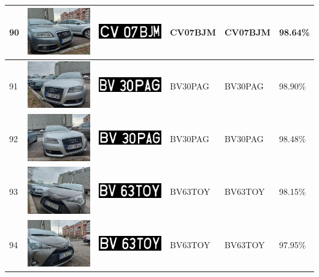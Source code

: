 \documentclass[a4paper,12pt]{report}
\begin{document}
\begin{longtable}{| m{0.6cm} | m{3cm} | m{3cm} | m{1.8cm} | m{1.8cm} | m{1.8cm} |}
        90 & \includegraphics[width=3cm,keepaspectratio]{dataset/53_s1.jpg} & \includegraphics[width=3cm,keepaspectratio]{segmentari/90.jpg} & CV07BJM & CV07BJM & 98.64\% \\ \hline
        91 & \includegraphics[width=3cm,keepaspectratio]{dataset/54_d1.jpg} & \includegraphics[width=3cm,keepaspectratio]{segmentari/91.jpg} & BV30PAG & BV30PAG & 98.90\% \\ \hline
        92 & \includegraphics[width=3cm,keepaspectratio]{dataset/54_s1.jpg} & \includegraphics[width=3cm,keepaspectratio]{segmentari/92.jpg} & BV30PAG & BV30PAG & 98.48\% \\ \hline
        93 & \includegraphics[width=3cm,keepaspectratio]{dataset/55_d1.jpg} & \includegraphics[width=3cm,keepaspectratio]{segmentari/93.jpg} & BV63TOY & BV63TOY & 98.15\% \\ \hline
        94 & \includegraphics[width=3cm,keepaspectratio]{dataset/55_s1.jpg} & \includegraphics[width=3cm,keepaspectratio]{segmentari/94.jpg} & BV63TOY & BV63TOY & 97.95\% \\ \hline

\end{longtable}
\end{document}
